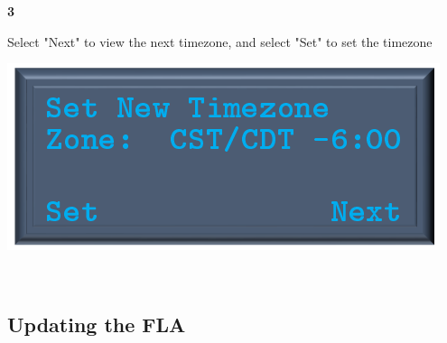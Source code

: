 \documentclass[11pt, oneside]{book}
\begin{document}
\noindent\begin{minipage}{0.45\textwidth}%
	\begin{center}
		\textbf{3}
	\end{center}
	Select "Next" to view the next timezone, and select "Set" to set the timezone
\end{minipage}%
\hfill%
\begin{minipage}{0.45\textwidth} 
	\includegraphics[width=\linewidth]{../media/pstricks_files/10_change_time_zone_select}
\end{minipage}\\


\subsection{Updating the FLA}
\end{document}
